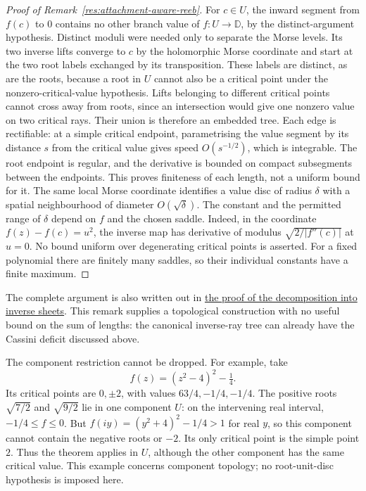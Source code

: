 \documentclass[11pt]{article}
\begin{document}
\begin{proof}[Proof of Remark~\ref{res:attachment-aware-reeb}]
For $c\in U$, the inward segment from $f(c)$ to $0$ contains no other
branch value of $f:U\to\mathbb D$, by the distinct-argument hypothesis.
Distinct moduli were needed only to separate the Morse levels. Its two
inverse lifts converge to $c$ by the holomorphic Morse coordinate and
start at the two root labels exchanged by its transposition. These labels
are distinct, as are the roots, because a root in $U$ cannot also be a
critical point under the nonzero-critical-value hypothesis. Lifts belonging to
different critical points cannot cross away from roots, since an intersection
would give one nonzero value on two critical rays. Their union is therefore
an embedded tree. Each edge is rectifiable: at a simple critical endpoint,
parametrising the value segment by its distance $s$ from the critical value
gives speed $O(s^{-1/2})$, which is integrable. The root endpoint is regular,
and the derivative is bounded on compact subsegments between the endpoints.
This proves finiteness of each length, not a uniform bound for it.
The same local Morse coordinate identifies a value disc of
radius $\delta$ with a spatial neighbourhood of diameter
$O(\sqrt\delta)$. The constant and the permitted range of $\delta$
depend on $f$ and the chosen saddle. Indeed, in the coordinate
$f(z)-f(c)=u^2$, the inverse map has derivative of modulus
$\sqrt{2/|f''(c)|}$ at $u=0$. No bound uniform over degenerating
critical points is asserted. For a fixed polynomial there are finitely
many saddles, so their individual constants have a finite maximum.
\end{proof}

The complete argument is also written out in
\href{https://github.com/wcook04/plectis-erdos/blob/a729f05c40398663fd586c9da487ad874d898639/research_corpus/Erdos1041/AttachmentAwareReeb.md}{the proof of the decomposition into inverse sheets}.
This remark supplies a topological construction with no useful bound
on the sum of lengths: the canonical inverse-ray tree can already have
the Cassini deficit discussed above.

The component restriction cannot be dropped. For example, take
\[
 f(z)=(z^2-4)^2-\tfrac14.
\]
Its critical points are $0,\pm2$, with values $63/4,-1/4,-1/4$.
The positive roots $\sqrt{7/2}$ and $\sqrt{9/2}$ lie in one component
$U$: on the intervening real interval, $-1/4\le f\le0$.
But $f(iy)=(y^2+4)^2-1/4>1$ for real $y$, so this component cannot
contain the negative roots or $-2$. Its only critical point is the simple
point $2$. Thus the theorem applies in $U$, although the other component
has the same critical value. This example concerns component topology;
no root-unit-disc hypothesis is imposed here.
\end{document}
